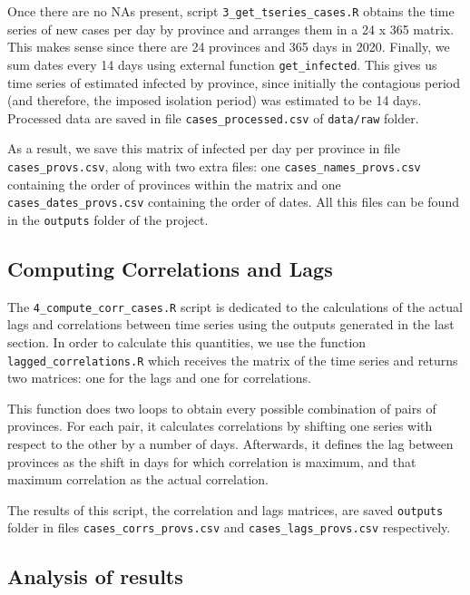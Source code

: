 \documentclass[
]{article}
\begin{document}
Once there are no NAs present, script \texttt{3\_get\_tseries\_cases.R}
obtains the time series of new cases per day by province and arranges
them in a 24 x 365 matrix. This makes sense since there are 24 provinces
and 365 days in 2020. Finally, we sum dates every 14 days using external
function \texttt{get\_infected}. This gives us time series of estimated
infected by province, since initially the contagious period (and
therefore, the imposed isolation period) was estimated to be 14 days.
Processed data are saved in file \texttt{cases\_processed.csv} of
\texttt{data/raw} folder.

As a result, we save this matrix of infected per day per province in
file \texttt{cases\_provs.csv}, along with two extra files: one
\texttt{cases\_names\_provs.csv} containing the order of provinces
within the matrix and one \texttt{cases\_dates\_provs.csv} containing
the order of dates. All this files can be found in the \texttt{outputs}
folder of the project.

\hypertarget{computing-correlations-and-lags}{%
\subsection{Computing Correlations and
Lags}\label{computing-correlations-and-lags}}

The \texttt{4\_compute\_corr\_cases.R} script is dedicated to the
calculations of the actual lags and correlations between time series
using the outputs generated in the last section. In order to calculate
this quantities, we use the function \texttt{lagged\_correlations.R}
which receives the matrix of the time series and returns two matrices:
one for the lags and one for correlations.

This function does two loops to obtain every possible combination of
pairs of provinces. For each pair, it calculates correlations by
shifting one series with respect to the other by a number of days.
Afterwards, it defines the lag between provinces as the shift in days
for which correlation is maximum, and that maximum correlation as the
actual correlation.

The results of this script, the correlation and lags matrices, are saved
\texttt{outputs} folder in files \texttt{cases\_corrs\_provs.csv} and
\texttt{cases\_lags\_provs.csv} respectively.

\hypertarget{analysis-of-results}{%
\subsection{Analysis of results}\label{analysis-of-results}}
\end{document}
